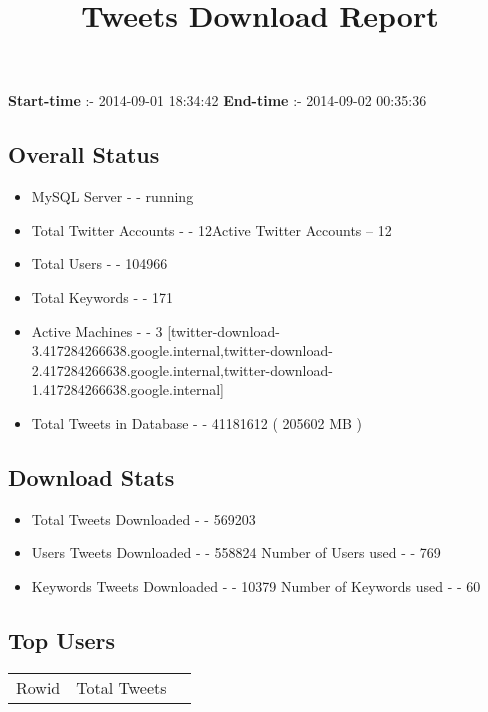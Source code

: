 \documentclass{article}\usepackage[T1]{fontenc}
\begin{document}
\title{\textbf{Tweets Download Report}}
               \date{}
                \maketitle
               \centerline{\textbf{Start-time} :- 2014-09-01 18:34:42 \hspace{40pt} \textbf{End-time} :- 2014-09-02 00:35:36}               \subsection*{Overall Status}                \begin{itemize}                \item MySQL Server - - running               \item Total Twitter Accounts - - 12\newline Active Twitter Accounts -- 12               \item Total Users - - 104966               \item Total Keywords - - 171               \item Active Machines - - 3 [twitter-download-3.417284266638.google.internal,twitter-download-2.417284266638.google.internal,twitter-download-1.417284266638.google.internal]               \item Total Tweets in Database - - 41181612 ( 205602 MB )               \end{itemize}               \subsection*{Download Stats}                \begin{itemize}                \item Total Tweets Downloaded - - 569203               \item Users Tweets Downloaded - - 558824 \newline Number of Users used - - 769               \item Keywords Tweets Downloaded - - 10379 \newline Number of Keywords used - - 60              \end{itemize}              \subsection*{Top Users}\begin{tabular}{|c|c|c|}         \hline         Rowid & Total Tweets \\ 

\end{tabular}
\end{document}
